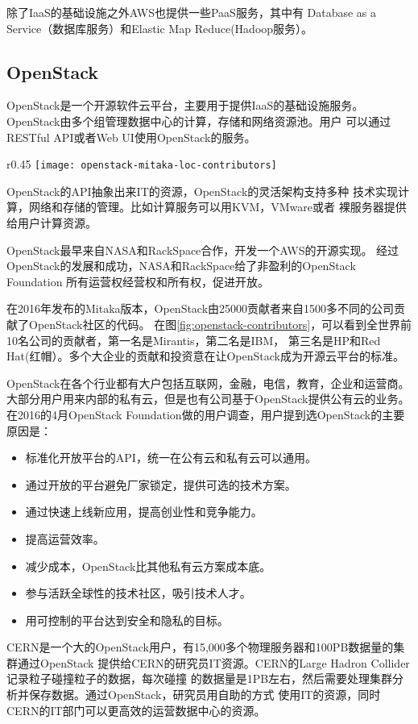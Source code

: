 除了IaaS的基础设施之外AWS也提供一些PaaS服务，其中有
Database as a Service（数据库服务）和Elastic Map Reduce(Hadoop服务）。


\subsection{OpenStack}
\label{subsubsec:openstack}
OpenStack是一个开源软件云平台，主要用于提供IaaS的基础设施服务。
OpenStack由多个组管理数据中心的计算，存储和网络资源池。用户
可以通过RESTful API或者Web UI使用OpenStack的服务。
\begin{wrapfigure}{r}{0.45\textwidth}
  \centering
    \texttt{[image: openstack-mitaka-loc-contributors]}
    \caption{OpenStack的Mitaka版本贡献者排名，按Lines of Code排序。\cite{stackalytics_mitaka_loc}}
  \label{fig:openstack-contributors}
\end{wrapfigure}
OpenStack的API抽象出来IT的资源，OpenStack的灵活架构支持多种
技术实现计算，网络和存储的管理。比如计算服务可以用KVM，VMware或者
裸服务器提供给用户计算资源。

OpenStack最早来自NASA和RackSpace合作，开发一个AWS的开源实现。
经过OpenStack的发展和成功，NASA和RackSpace给了非盈利的OpenStack Foundation
所有运营权经营权和所有权，促进开放。


在2016年发布的Mitaka版本，OpenStack由25000贡献者来自1500多不同的公司贡献了OpenStack社区的代码。\cite{stackalytics_mitaka_loc}
在图\ref{fig:openstack-contributors}，可以看到全世界前10名公司的贡献者，第一名是Mirantis，第二名是IBM，
第三名是HP和Red Hat(红帽）。多个大企业的贡献和投资意在让OpenStack成为开源云平台的标准。

OpenStack在各个行业都有大户包括互联网，金融，电信，教育，企业和运营商。
大部分用户用来内部的私有云，但是也有公司基于OpenStack提供公有云的业务。
在2016的4月OpenStack Foundation做的用户调查，用户提到选OpenStack的主要原因是：
\begin{itemize}
  \item 标准化开放平台的API，统一在公有云和私有云可以通用。
  \item 通过开放的平台避免厂家锁定，提供可选的技术方案。
  \item 通过快速上线新应用，提高创业性和竞争能力。
  \item 提高运营效率。
  \item 减少成本，OpenStack比其他私有云方案成本底。
  \item 参与活跃全球性的技术社区，吸引技术人才。
  \item 用可控制的平台达到安全和隐私的目标。
\end{itemize}
CERN是一个大的OpenStack用户，有15,000多个物理服务器和100PB数据量的集群通过OpenStack
提供给CERN的研究员IT资源。CERN的Large Hadron Collider记录粒子碰撞粒子的数据，每次碰撞
的数据量是1PB左右，然后需要处理集群分析并保存数据。通过OpenStack，研究员用自助的方式
使用IT的资源，同时CERN的IT部门可以更高效的运营数据中心的资源。\cite{cern_user_story}

